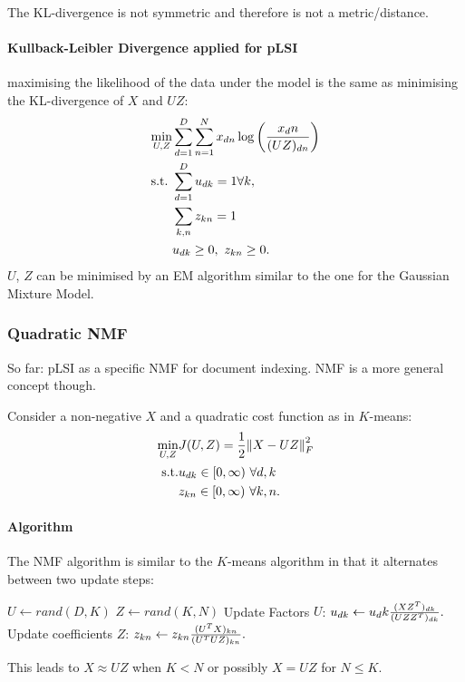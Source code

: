 The KL-divergence is not symmetric and therefore is not a metric/distance.

\paragraph{Kullback-Leibler Divergence applied for pLSI} maximising the likelihood of the data under the model is the same as minimising the KL-divergence of $X$ and $UZ$:
\begin{align*}
    \min_{U,Z} &\sum_{d=1}^D\sum_{n=1}^N x_{dn} \log\left({x_dn\over (UZ)_{dn}}\right)\\
    \text{s.t.}\ & \sum_{d=1} ^D u_{dk} = 1\forall k,\\
    &\sum_{k,n} z_{kn} =1\\
    &u_{dk} \geq 0,\ z_{kn} \geq 0.
\end{align*}
$U$, $Z$ can be minimised by an EM algorithm similar to the one for the Gaussian Mixture Model.

\subsubsection{Quadratic NMF}
So far: pLSI as a specific NMF for document indexing. NMF is a more general concept though. 

Consider a non-negative $X$ and a quadratic cost function as in $K$-means:
\begin{align*}
     \min_{U,Z}& J(U,Z) = {1\over 2} \norm{X-UZ}_F^2\\
     \text{s.t.}& u_{dk} \in [0,\infty)\ \forall d,k\\
     &z_{kn} \in [0,\infty)\ \forall k, n.
\end{align*}


\paragraph{Algorithm} The NMF algorithm is similar to the $K$-means algorithm in that it alternates between two update steps:
\begin{algorithmic}
\STATE $U \gets rand(D,K)$
\STATE $Z \gets rand(K,N)$
    \STATE Update Factors $U$: $u_{dk} \gets u_dk {(XZ^T)_{dk}\over (UZZ^T)_{dk}}.$
    \STATE Update coefficients $Z$: $z_{kn} \gets z_{kn} {(U^TX)_{kn}\over (U^TUZ)_{kn}}.$

\ENDFOR
\end{algorithmic}
This leads to $X\approx UZ$ when $K<N$ or possibly $X=UZ$ for $N\leq K$.

